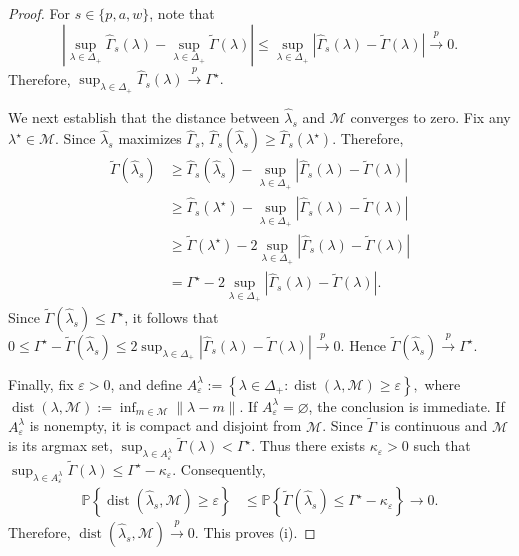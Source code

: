 \documentclass[12pt,leqno,titlepage]{amsart}
\newcommand{\DeltaP}{\Delta_+}
\newcommand{\1}{\mathbbm{1}}
\begin{document}
\begin{bibunit}
{\begin{proof}
For $s  \in \{p, a, w\}$, note that
\[
\left|
\sup_{\lambda\in\DeltaP}\widehat\Gamma_s(\lambda)
-
\sup_{\lambda\in\DeltaP}\widetilde\Gamma(\lambda)
\right|
\le
\sup_{\lambda\in\DeltaP}
\left|\widehat\Gamma_s(\lambda)-\widetilde\Gamma(\lambda)\right|
\overset{p}{\rightarrow}0.
\]
Therefore,
$
\sup_{\lambda\in\Delta_+}\widehat\Gamma_s(\lambda)
\xrightarrow{p}
\Gamma^\star.
$

We next establish that the distance between \(\widehat\lambda_s\) and \(\mathcal M\) converges to zero. Fix any \(\lambda^\star\in\mathcal M\). Since \(\widehat\lambda_s\) maximizes \(\widehat\Gamma_s\),
$
\widehat\Gamma_s(\widehat\lambda_s)
\ge
\widehat\Gamma_s(\lambda^\star).
$
Therefore,
\begin{align*}
\widetilde\Gamma(\widehat\lambda_s)
&\ge
\widehat\Gamma_s(\widehat\lambda_s)
-
\sup_{\lambda\in\Delta_+}
\left|\widehat\Gamma_s(\lambda)-\widetilde\Gamma(\lambda)\right| \\
&\ge
\widehat\Gamma_s(\lambda^\star)
-
\sup_{\lambda\in\Delta_+}
\left|\widehat\Gamma_s(\lambda)-\widetilde\Gamma(\lambda)\right| \\
&\ge
\widetilde\Gamma(\lambda^\star)
-
2\sup_{\lambda\in\Delta_+}
\left|\widehat\Gamma_s(\lambda)-\widetilde\Gamma(\lambda)\right| \\
&=
\Gamma^\star
-
2\sup_{\lambda\in\Delta_+}
\left|\widehat\Gamma_s(\lambda)-\widetilde\Gamma(\lambda)\right|.
\end{align*}
Since \(\widetilde\Gamma(\widehat\lambda_s)\le\Gamma^\star\), it follows that
$
0
\le
\Gamma^\star-\widetilde\Gamma(\widehat\lambda_s)
\le
2\sup_{\lambda\in\Delta_+}
\left|\widehat\Gamma_s(\lambda)-\widetilde\Gamma(\lambda)\right|
\xrightarrow{p}0.
$
Hence
$
\widetilde\Gamma(\widehat\lambda_s)
\xrightarrow{p}
\Gamma^\star.
$

Finally, fix \(\varepsilon>0\), and define
$
A_\varepsilon^\lambda
:=
\left\{\lambda\in\Delta_+:
\operatorname{dist}(\lambda,\mathcal M)\ge\varepsilon
\right\},$ where $
\operatorname{dist}(\lambda,\mathcal M)
:=
\inf_{m\in\mathcal M}\|\lambda-m\|.
$
If \(A_\varepsilon^\lambda=\varnothing\), the conclusion is immediate. If \(A_\varepsilon^\lambda\) is nonempty, it is compact and disjoint from \(\mathcal M\). Since \(\widetilde\Gamma\) is continuous and \(\mathcal M\) is its argmax set,
$
\sup_{\lambda\in A_\varepsilon^\lambda}\widetilde\Gamma(\lambda)
<
\Gamma^\star.
$
Thus there exists \(\kappa_\varepsilon>0\) such that
$
\sup_{\lambda\in A_\varepsilon^\lambda}\widetilde\Gamma(\lambda)
\le
\Gamma^\star-\kappa_\varepsilon.
$
Consequently,
\begin{align*}
\mathbb P\left\{\operatorname{dist}(\widehat\lambda_s,\mathcal M)\ge\varepsilon\right\}
&\le
\mathbb P\left\{
\widetilde\Gamma(\widehat\lambda_s)
\le
\Gamma^\star-\kappa_\varepsilon
\right\}
\to 0.
\end{align*}
Therefore,
$
\operatorname{dist}(\widehat\lambda_s,\mathcal M)\xrightarrow{p}0.
$
This proves \textup{(i)}.



\end{proof}}
\end{bibunit}
\end{document}

